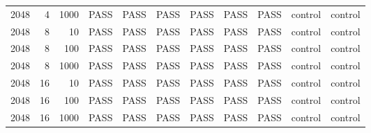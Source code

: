 \begin{tabular}{rrrcccccccc}
2048 & 4 & 1000 & PASS & PASS & PASS & PASS & PASS & PASS & control & control \\
2048 & 8 & 10 & PASS & PASS & PASS & PASS & PASS & PASS & control & control \\
2048 & 8 & 100 & PASS & PASS & PASS & PASS & PASS & PASS & control & control \\
2048 & 8 & 1000 & PASS & PASS & PASS & PASS & PASS & PASS & control & control \\
2048 & 16 & 10 & PASS & PASS & PASS & PASS & PASS & PASS & control & control \\
2048 & 16 & 100 & PASS & PASS & PASS & PASS & PASS & PASS & control & control \\
2048 & 16 & 1000 & PASS & PASS & PASS & PASS & PASS & PASS & control & control \\
\bottomrule
\end{tabular}
